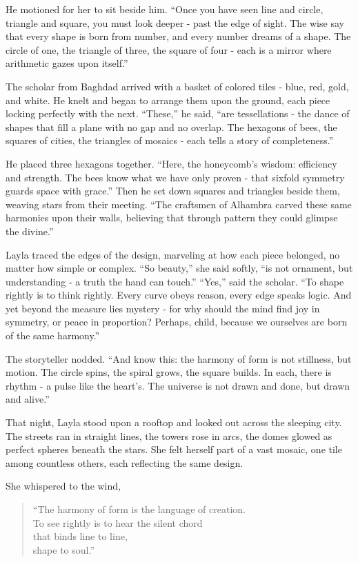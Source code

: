 \documentclass[
  letterpaper,
  DIV=11,
  numbers=noendperiod]{scrreprt}
\begin{document}
He motioned for her to sit beside him. ``Once you have seen line and
circle, triangle and square, you must look deeper - past the edge of
sight. The wise say that every shape is born from number, and every
number dreams of a shape. The circle of one, the triangle of three, the
square of four - each is a mirror where arithmetic gazes upon itself.''

The scholar from Baghdad arrived with a basket of colored tiles - blue,
red, gold, and white. He knelt and began to arrange them upon the
ground, each piece locking perfectly with the next. ``These,'' he said,
``are tessellations - the dance of shapes that fill a plane with no gap
and no overlap. The hexagons of bees, the squares of cities, the
triangles of mosaics - each tells a story of completeness.''

He placed three hexagons together. ``Here, the honeycomb's wisdom:
efficiency and strength. The bees know what we have only proven - that
sixfold symmetry guards space with grace.'' Then he set down squares and
triangles beside them, weaving stars from their meeting. ``The craftsmen
of Alhambra carved these same harmonies upon their walls, believing that
through pattern they could glimpse the divine.''

Layla traced the edges of the design, marveling at how each piece
belonged, no matter how simple or complex. ``So beauty,'' she said
softly, ``is not ornament, but understanding - a truth the hand can
touch.'' ``Yes,'' said the scholar. ``To shape rightly is to think
rightly. Every curve obeys reason, every edge speaks logic. And yet
beyond the measure lies mystery - for why should the mind find joy in
symmetry, or peace in proportion? Perhaps, child, because we ourselves
are born of the same harmony.''

The storyteller nodded. ``And know this: the harmony of form is not
stillness, but motion. The circle spins, the spiral grows, the square
builds. In each, there is rhythm - a pulse like the heart's. The
universe is not drawn and done, but drawn and alive.''

That night, Layla stood upon a rooftop and looked out across the
sleeping city. The streets ran in straight lines, the towers rose in
arcs, the domes glowed as perfect spheres beneath the stars. She felt
herself part of a vast mosaic, one tile among countless others, each
reflecting the same design.

She whispered to the wind,

\begin{quote}
``The harmony of form is the language of creation.\\
To see rightly is to hear the silent chord\\
that binds line to line,\\
shape to soul.''
\end{quote}
\end{document}
